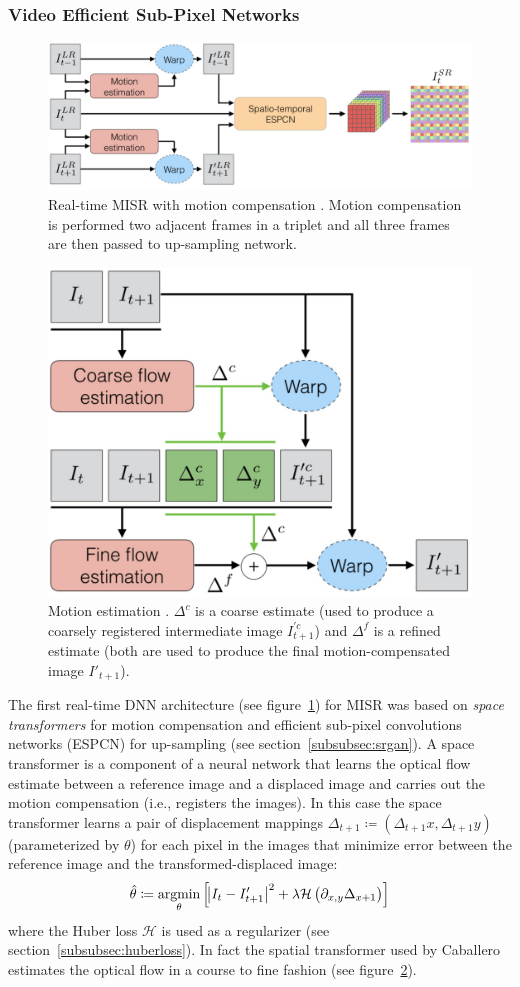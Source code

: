 \subsubsection{Video Efficient Sub-Pixel Networks}
\begin{figure}
    \includegraphics[width=.49\textwidth]{figures/neural_networks/realtime_epscn.png}
    \caption{Real-time MISR with motion compensation \cite{caballero2017real}. Motion compensation is performed two adjacent frames in a triplet and all three frames are then passed to up-sampling network.}\label{fig:realtimeepscn}
\end{figure}
\begin{figure}
    \includegraphics[width=.49\textwidth]{figures/neural_networks/space_transformer.png}
    \caption{Motion estimation \cite{caballero2017real}. \(\Delta^c\) is a coarse estimate (used to produce a coarsely registered intermediate image \(I_{t+1}^{'c}\)) and \(\Delta^f\) is a refined estimate (both are used to produce the final motion-compensated image \(I'_{t+1}\)).}\label{fig:spacetransformer}
\end{figure}
The first real-time DNN architecture (see figure~\ref{fig:realtimeepscn}) for MISR was based on \textit{space transformers} for motion compensation and efficient sub-pixel convolutions networks (ESPCN) for up-sampling (see section~\ref{subsubsec:srgan}).
%
A space transformer  \cite{jaderberg2015spatial} is a component of a neural network that learns the optical flow estimate between a reference image and a displaced image and carries out the motion compensation (i.e., registers the images).
%
In this case the space transformer learns a pair of displacement mappings \(\Delta_{t+1} \coloneqq (\Delta_{t+1}x, \Delta_{t+1} y)\) (parameterized by \(\theta\)) for each pixel in the images that minimize error between the reference image and the transformed-displaced image:
\begin{equation}
    \hat{\theta} \coloneqq \underset{\theta}{\text{argmin}}\left[\abs{I_t - I'_{t+1}}^2 + \lambda \mathcal{H}\left( \partial_{x,y} \Delta_{x+1} \right)\right]
\end{equation}
where the Huber loss \(\mathcal{H}\) is used as a regularizer (see section~\ref{subsubsec:huberloss}).
%
In fact the spatial transformer used by Caballero \etal estimates the optical flow in a course to fine fashion (see figure~\ref{fig:spacetransformer}).


